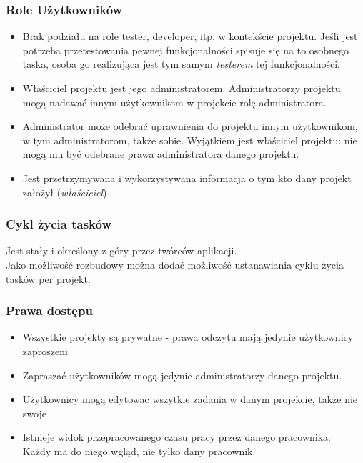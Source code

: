 \documentclass[a4paper,12pt,notitlepage]{mwrep}
\begin{document}
\subsubsection{Role Użytkowników}
\begin{itemize}
	\item	Brak podziału na role tester, developer, itp. w kontekście projektu.
			Jeśli jest potrzeba przetestowania pewnej funkcjonalności spisuje się na to osobnego taska,
			osoba go realizująca jest tym samym \emph{testerem} tej funkcjonalności.
	\item	Właściciel projektu jest jego administratorem. Administratorzy projektu mogą nadawać innym
			użytkownikom w projekcie rolę administratora.
	\item	Administrator może odebrać uprawnienia do projektu innym użytkownikom, w tym administratorom,
			także sobie. Wyjątkiem jest właściciel projektu: nie mogą mu być odebrane prawa administratora danego projektu.
	\item	Jest przetrzymywana i wykorzystywana informacja o tym kto dany projekt założył (\emph{właściciel})
\end{itemize}

\subsubsection{Cykl życia tasków}
\noindent
Jest stały i określony z góry przez twórców aplikacji.\\
Jako możliwość rozbudowy można dodać możliwość ustanawiania cyklu życia tasków per projekt.

\subsubsection{Prawa dostępu}
\begin{itemize}
	\item	Wszystkie projekty są prywatne - prawa odczytu mają jedynie użytkownicy zaproszeni
	\item	Zapraszać użytkowników mogą jedynie administratorzy danego projektu.
	\item	Użytkownicy mogą edytowac wszytkie zadania w danym projekcie, także nie swoje
	\item	Istnieje widok przepracowanego czasu pracy przez danego pracownika.\\
			Każdy ma do niego wgląd, nie tylko dany pracownik
\end{itemize}
\end{document}
